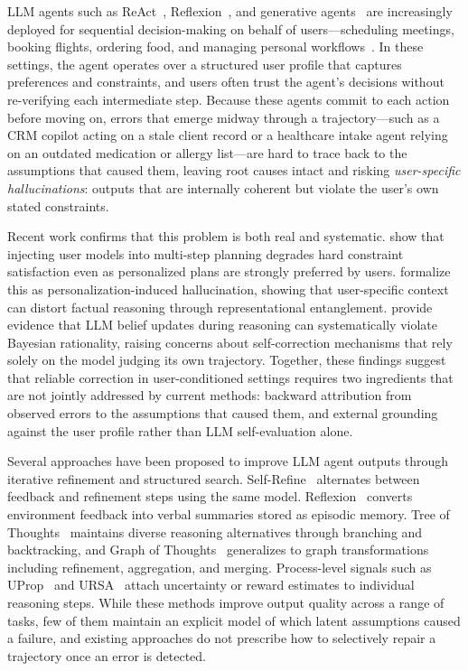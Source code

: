 LLM agents such as ReAct~\citep{yao2023react},
Reflexion~\citep{shinn2023reflexion}, and generative agents~\citep{park2023generative}
are increasingly deployed for sequential decision-making on behalf of
users---scheduling meetings, booking flights, ordering food, and managing
personal workflows~\citep{wang2024survey,liu2024agentbench}. In these settings,
the agent operates over a structured user profile that captures preferences
and constraints, and users often trust the agent's decisions without
re-verifying each intermediate step. Because these agents commit to each
action before moving on, errors that emerge midway through a trajectory---such as a CRM copilot acting on a stale client record or a healthcare intake
agent relying on an outdated medication or allergy list---are hard to trace
back to the assumptions that caused them, leaving root causes intact and risking
\emph{user-specific hallucinations}: outputs that are internally coherent
but violate the user's own stated constraints.

Recent work confirms that this problem is both real and systematic.
\citet{singh2024travelplanner} show that injecting user models into multi-step
planning degrades hard constraint satisfaction even as personalized plans are
strongly preferred by users. \citet{sun2026personalization} formalize this as
personalization-induced hallucination, showing that user-specific context can
distort factual reasoning through representational entanglement.
\citet{he2025martingale} provide evidence that LLM belief updates during reasoning
can systematically violate Bayesian rationality, raising concerns about
self-correction mechanisms that rely solely on the model judging its own
trajectory. Together, these findings suggest that reliable correction in
user-conditioned settings requires two ingredients that are not jointly
addressed by current methods: backward attribution from observed errors to the
assumptions that caused them, and external grounding against the user profile
rather than LLM self-evaluation alone.

Several approaches have been proposed to improve LLM agent outputs through
iterative refinement and structured search. Self-Refine~\citep{madaan2023selfrefine}
alternates between feedback and refinement steps using the same model.
Reflexion~\citep{shinn2023reflexion} converts environment feedback into verbal
summaries stored as episodic memory. Tree of Thoughts~\citep{yao2023tot}
maintains diverse reasoning alternatives through branching and backtracking,
and Graph of Thoughts~\citep{besta2024got} generalizes to graph transformations
including refinement, aggregation, and merging. Process-level signals such as
UProp~\citep{duan2025uprop} and URSA~\citep{luo2025ursa} attach uncertainty or
reward estimates to individual reasoning steps. While these methods improve
output quality across a range of tasks, few of them maintain an explicit model
of which latent assumptions caused a failure, and existing approaches do not
prescribe how to selectively repair a trajectory once an error is detected.

